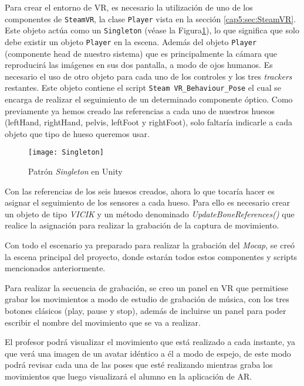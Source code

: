 Para crear el entorno de VR, es necesario la utilización de uno de los componentes de \texttt{SteamVR}, la clase \texttt{Player} vista en la sección \ref{cap5:sec:SteamVR}. Este objeto actúa como un \texttt{Singleton} (véase la Figura\ref{fig:Singleton}), lo que significa que solo debe existir un objeto \texttt{Player} en la escena. Además del objeto \texttt{Player} (componente head de nuestro sistema) que es principalmente la cámara que reproducirá las imágenes en sus dos pantalla, a modo de ojos humanos. Es necesario el uso de otro objeto para cada uno de los controles y los tres \textit{trackers} restantes. Este objeto contiene el script \texttt{Steam VR\_Behaviour\_Pose} el cual se encarga de realizar el seguimiento de un determinado componente óptico. Como previamente ya hemos creado las referencias a cada uno de nuestros huesos (leftHand, rightHand, pelvis, leftFoot y rightFoot), solo faltaría indicarle a cada objeto que tipo de hueso queremos usar.

\begin{figure}[h!]
    \centering 
    \texttt{[image: Singleton]}
    \caption{Patrón \textit{Singleton} en Unity}
    \label{fig:Singleton} 
\end{figure} 

Con las referencias de los seis huesos creados, ahora lo que tocaría hacer es asignar el seguimiento de los sensores a cada hueso. Para ello es necesario crear un objeto de tipo \textit{VICIK} y un método denominado \textit{UpdateBoneReferences()} que realice la asignación para realizar la grabación de la captura de movimiento.

Con todo el escenario ya preparado para realizar la grabación del \textit{Mocap}, se creó la escena principal del proyecto, donde estarán todos estos componentes y scripts mencionados anteriormente. 

Para realizar la secuencia de grabación, se creo un panel en VR que permitiese grabar los movimientos a modo de estudio de grabación de música, con los tres botones clásicos (play, pause y stop), además de incluirse un panel para poder escribir el nombre del movimiento que se va a realizar.

El profesor podrá visualizar el movimiento que está realizado a cada instante, ya que verá una imagen de un avatar idéntico a él a modo de espejo, de este modo podrá revisar cada una de las poses que esté realizando mientras graba los movimientos que luego visualizará el alumno en la aplicación de AR. 

